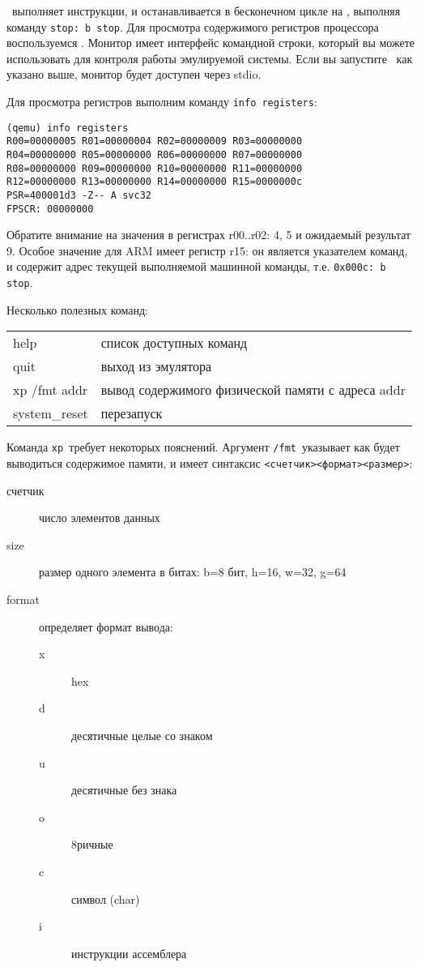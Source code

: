 \qemu\ выполняет инструкции, и останавливается в бесконечном цикле на
, выполняя команду \verb|stop: b stop|. Для просмотра содержимого
регистров процессора воспользуемся .
Монитор имеет интерфейс командной строки, который вы можете использовать для
контроля работы эмулируемой системы. Если вы запустите \qemu\ как указано выше,
монитор будет доступен через stdio.

Для просмотра регистров выполним команду \verb|info registers|:

\begin{verbatim}
(qemu) info registers
R00=00000005 R01=00000004 R02=00000009 R03=00000000
R04=00000000 R05=00000000 R06=00000000 R07=00000000
R08=00000000 R09=00000000 R10=00000000 R11=00000000
R12=00000000 R13=00000000 R14=00000000 R15=0000000c
PSR=400001d3 -Z-- A svc32
FPSCR: 00000000
\end{verbatim}

Обратите внимание на значения в регистрах r00..r02: 4, 5 и ожидаемый результат
9. Особое значение для ARM имеет регистр r15: он является указателем команд, и
содержит адрес текущей выполняемой машинной команды, т.е. \verb|0x000c: b stop|.


Несколько полезных команд:

\begin{tabular}{l l}
help & список доступных команд \\
quit & выход из эмулятора \\
xp /fmt addr & вывод содержимого физической памяти с адреса addr \\
system\_reset & перезапуск \\
\end{tabular}
\bigskip

Команда \verb|xp|\ требует некоторых пояснений. Аргумент \verb|/fmt|\ указывает
как будет выводиться содержимое памяти, и имеет синтаксис
\verb|<счетчик><формат><размер>|:

\begin{description}
\item[счетчик] число элементов данных
\item[size] размер одного элемента в битах: b=8 бит, h=16, w=32, g=64
\item[format] определяет формат вывода:
\begin{description}
\item[x] hex
\item[d] десятичные целые со знаком
\item[u] десятичные без знака
\item[o] 8ричные
\item[c] символ (char)
\item[i] инструкции ассемблера
\end{description}
\end{description}

